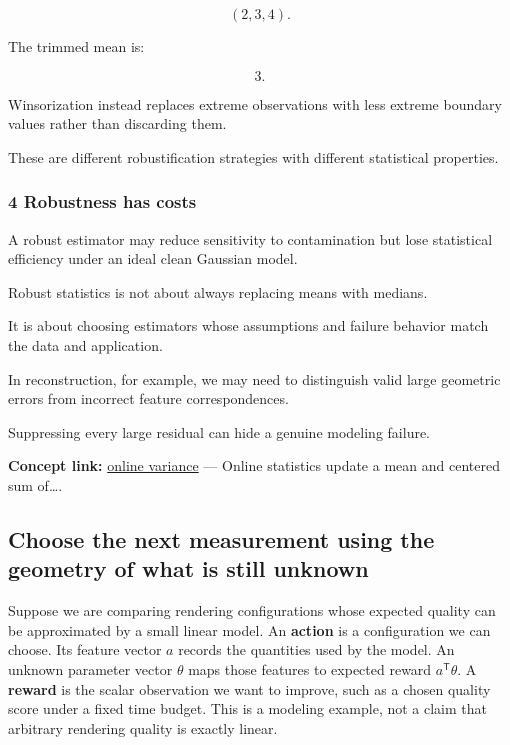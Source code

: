 \[
 (2,3,4).
\]

The trimmed mean is:

\[
 \boxed{3}.
\]

Winsorization instead replaces extreme observations with less extreme boundary values rather than discarding them.

These are different robustification strategies with different statistical properties.

\subsubsection{4 Robustness has costs}\label{02-foundations-ii-ch030-robustness-has-costs}

\hypertarget{02-foundations-ii-ch030-robustness-has-costs}{}

A robust estimator may reduce sensitivity to contamination but lose statistical efficiency under an ideal clean Gaussian model.

Robust statistics is not about always replacing means with medians.

It is about choosing estimators whose assumptions and failure behavior match the data and application.

In reconstruction, for example, we may need to distinguish valid large geometric errors from incorrect feature correspondences.

Suppressing every large residual can hide a genuine modeling failure.

\textbf{Concept link:} \hyperref[02-foundations-ii-ch030-finite-samples-need-stable-descriptive-statistics]{online variance} --- Online statistics update a mean and centered sum of\ldots.

\subsection{Choose the next measurement using the geometry of what is still unknown}\label{02-foundations-ii-ch030-choose-the-next-measurement-using-the-geometry-of-what-is-still-unknown}

\hypertarget{02-foundations-ii-ch030-choose-the-next-measurement-using-the-geometry-of-what-is-still-unknown}{}

Suppose we are comparing rendering configurations whose expected quality can be approximated by a small linear model. An \textbf{action} is a configuration we can choose. Its feature vector \(a\) records the quantities used by the model. An unknown parameter vector \(\theta\) maps those features to expected reward \(a^{\mathsf T}\theta\). A \textbf{reward} is the scalar observation we want to improve, such as a chosen quality score under a fixed time budget. This is a modeling example, not a claim that arbitrary rendering quality is exactly linear.

